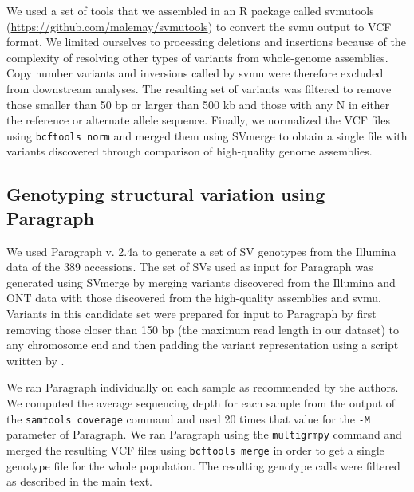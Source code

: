 \documentclass[12pt]{report}
\begin{document}
We used a set of tools that we assembled in an R package called svmutools
(\url{https://github.com/malemay/svmutools}) to convert the svmu output to VCF
format. We limited ourselves to processing deletions and insertions because of
the complexity of resolving other types of variants from whole-genome
assemblies.  Copy number variants and inversions called by svmu were therefore
excluded from downstream analyses. The
resulting set of variants was filtered to remove those smaller than 50 bp or larger than 500
kb and those with any N in either the reference or alternate allele sequence.
Finally, we normalized the VCF files using \texttt{bcftools norm} and merged
them using SVmerge to obtain a single file with variants discovered through
comparison of high-quality genome assemblies.

\subsection*{Genotyping structural variation using Paragraph}
\label{sv-gwas-sv-genotyping-paragraph}

We used Paragraph v. 2.4a \citep{chen2019}
to generate a set of SV genotypes from the Illumina data of the 389 accessions.
The set of SVs used as input for Paragraph was generated using SVmerge by
merging variants discovered from the Illumina and ONT data with
those discovered from the high-quality assemblies and svmu.
Variants in this candidate set were prepared for input to Paragraph by first removing
those closer than 150 bp (the maximum read length in our dataset) to any
chromosome end and then padding the variant representation using a script written by
\cite{hickey2020}. 

We ran Paragraph individually on each sample as recommended by the authors.  We
computed the average sequencing depth for each sample from the output of the
\texttt{samtools coverage} command and used 20 times that value for the
\texttt{-M} parameter of Paragraph.  We ran Paragraph using the
\texttt{multigrmpy} command and merged the resulting VCF files using
\texttt{bcftools merge} in order to get a  single genotype file for the whole
population. The resulting genotype calls were filtered as described in the main
text.
\end{document}

